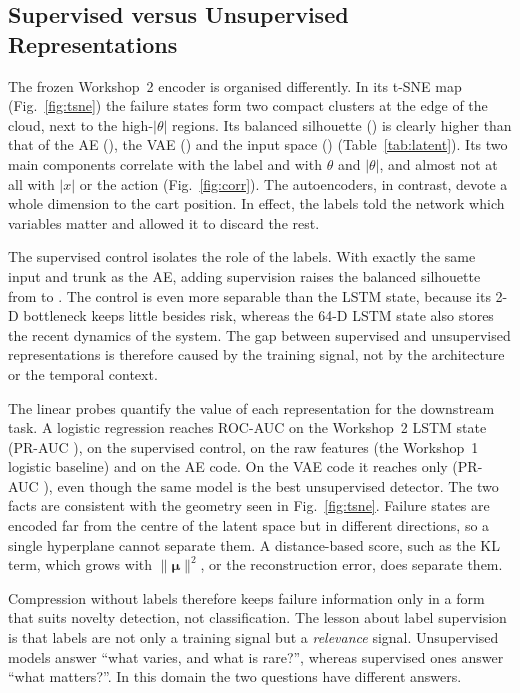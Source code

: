 \documentclass[conference]{IEEEtran}
\begin{document}
\subsection{Supervised versus Unsupervised Representations}
The frozen Workshop~2 encoder is organised differently. In its t-SNE map
(Fig.~\ref{fig:tsne}) the failure states form two compact clusters at the edge of the cloud,
next to the high-$|\theta|$ regions. Its balanced silhouette (\silSup) is clearly higher
than that of the AE (\silAE), the VAE (\silVAE) and the input space (\silRaw)
(Table~\ref{tab:latent}). Its two main components correlate with the label and with
$\theta$ and $|\theta|$, and almost not at all with $|x|$ or the action
(Fig.~\ref{fig:corr}). The autoencoders, in contrast, devote a whole dimension to the cart
position. In effect, the labels told the network which variables matter and allowed it to
discard the rest.

The supervised control isolates the role of the labels. With exactly the same input and
trunk as the AE, adding supervision raises the balanced silhouette from \silAE{} to
\silMlp. The control is even more separable than the LSTM state, because its 2-D bottleneck
keeps little besides risk, whereas the 64-D LSTM state also stores the recent dynamics of
the system. The gap between supervised and unsupervised representations is therefore caused
by the training signal, not by the architecture or the temporal context.

The linear probes quantify the value of each representation for the downstream task. A
logistic regression reaches ROC-AUC \probeSup{} on the Workshop~2 LSTM state (PR-AUC
\probePRSup), \probeMlp{} on the supervised control, \probeRaw{} on the raw features (the
Workshop~1 logistic baseline) and \probeAE{} on the AE code. On the VAE
code it reaches only \probeVAE{} (PR-AUC \probePRVAE), even though the same model is the best
unsupervised detector. The two facts are consistent with the geometry seen in
Fig.~\ref{fig:tsne}. Failure states are encoded far from the centre of the latent space but
in different directions, so a single hyperplane cannot separate them. A distance-based score,
such as the KL term, which grows with $\|\bm\mu\|^2$, or the reconstruction error, does
separate them.

Compression without labels therefore keeps failure information only in a form that suits
novelty detection, not classification. The lesson about label supervision is that labels are
not only a training signal but a \emph{relevance} signal. Unsupervised models answer ``what
varies, and what is rare?'', whereas supervised ones answer ``what matters?''. In this domain
the two questions have different answers.
\end{document}
